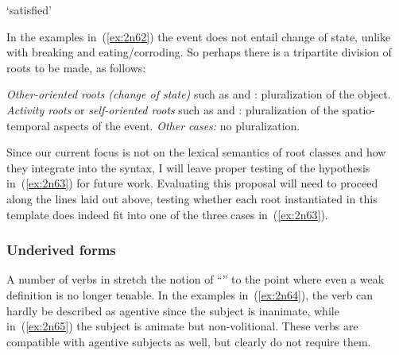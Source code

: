 \begin{exe}
\begin{xlist}
\begin{exe}
\begin{xlist}
\begin{exe}
\begin{xlist}
\begin{exe}
\begin{exe}
\begin{xlist}
\begin{exe}
\begin{xlist}
\begin{exe}
\begin{xlist}
\begin{exe}
\begin{xlist}
\begin{exe}
\begin{xlist}
\begin{exe}
\begin{xlist}
\begin{exe}
\begin{xlist}
\begin{exe}
\begin{xlist}
\begin{xlist}
\begin{exe}
\begin{xlist}
\begin{exe}
\begin{xlist}
\begin{exe}
\begin{xlist}
\begin{exe}
\begin{xlist}
\begin{exe}
\begin{xlist}
\begin{exe}
\begin{xlist}
\begin{exe}
\begin{xlist}
\begin{exe}
\begin{xlist}
\begin{exe}
\begin{xlist}
\begin{exe}
\begin{xlist}
\begin{exe}
\begin{xlist}
\begin{exe}
\begin{xlist}
\begin{xlist}
\begin{xlist}
\begin{exe}
\begin{xlist}
\begin{xlist}
\begin{xlist}
\begin{exe}
\begin{exe}
\begin{xlist}
\begin{exe}
\begin{xlist}
\begin{exe}
\begin{xlist}
\begin{exe}
\begin{xlist}
\begin{exe}
\begin{xlist}
\begin{exe}
\begin{xlist}
\begin{exe}
\begin{xlist}
\begin{exe}
\begin{exe}
\begin{xlist}
\begin{xlist}
\begin{exe}
\begin{xlist}
\begin{exe}
\begin{xlist}
\begin{exe}
\begin{xlist}
\begin{exe}
\begin{xlist}
\begin{exe}
\begin{xlist}
\begin{exe}
\begin{xlist}
\begin{exe}
\begin{exe}
\begin{exe}
\begin{xlist}
\begin{exe}
\begin{xlist}
\begin{exe}
\begin{xlist}
\begin{exe}
\begin{xlist}
`satisfied' 
 \z
\z 

In the examples in~(\ref{ex:2n62}) the event does not entail change of state, unlike with breaking and eating/corroding. So perhaps there is a tripartite division of roots to be made, as follows:
 \begin{exe}
 \ex  \label{ex:2n63}
 \begin{xlist} 
 	\ex   \textit{Other-oriented roots (change of state)} such as  and : pluralization of the object. 
 	\ex   \textit{Activity roots} or \textit{self-oriented roots} such as  and : pluralization of the spatio-temporal aspects of the event. 
 	\ex   \textit{Other cases:} no pluralization. 
 \z
\z 

Since our current focus is not on the lexical semantics of root classes and how they integrate into the syntax, I will leave proper testing of the hypothesis in~(\ref{ex:2n63}) for future work. Evaluating this proposal will need to proceed along the lines laid out above, testing whether each root instantiated in this template does indeed fit into one of the three cases in~(\ref{ex:2n63}).

		\subsubsection{Underived forms} \label{voice:va:sem:underived}
A number of verbs in {\tpie} stretch the notion of ``'' to the point where even a weak definition is no longer tenable. In the examples in~(\ref{ex:2n64}), the verb can hardly be described as agentive since the subject is inanimate, while in~(\ref{ex:2n65}) the subject is animate but non-volitional. These verbs are compatible with agentive subjects as well, but clearly do not require them.
 \begin{exe}
 \ex  \label{ex:2n64}
 \begin{xlist} 
   \ex {   
     \gll  }
\end{xlist}
\end{exe}
\end{xlist}
\end{exe}
\end{xlist}
\end{exe}
\end{xlist}
\end{exe}
\end{xlist}
\end{exe}
\end{xlist}
\end{exe}
\end{exe}
\end{exe}
\end{xlist}
\end{exe}
\end{xlist}
\end{exe}
\end{xlist}
\end{exe}
\end{xlist}
\end{exe}
\end{xlist}
\end{exe}
\end{xlist}
\end{exe}
\end{xlist}
\end{xlist}
\end{exe}
\end{exe}
\end{xlist}
\end{exe}
\end{xlist}
\end{exe}
\end{xlist}
\end{exe}
\end{xlist}
\end{exe}
\end{xlist}
\end{exe}
\end{xlist}
\end{exe}
\end{xlist}
\end{exe}
\end{exe}
\end{xlist}
\end{xlist}
\end{xlist}
\end{exe}
\end{xlist}
\end{xlist}
\end{xlist}
\end{exe}
\end{xlist}
\end{exe}
\end{xlist}
\end{exe}
\end{xlist}
\end{exe}
\end{xlist}
\end{exe}
\end{xlist}
\end{exe}
\end{xlist}
\end{exe}
\end{xlist}
\end{exe}
\end{xlist}
\end{exe}
\end{xlist}
\end{exe}
\end{xlist}
\end{exe}
\end{xlist}
\end{exe}
\end{xlist}
\end{xlist}
\end{exe}
\end{xlist}
\end{exe}
\end{xlist}
\end{exe}
\end{xlist}
\end{exe}
\end{xlist}
\end{exe}
\end{xlist}
\end{exe}
\end{xlist}
\end{exe}
\end{xlist}
\end{exe}
\end{exe}
\end{xlist}
\end{exe}
\end{xlist}
\end{exe}
\end{xlist}
\end{exe}
